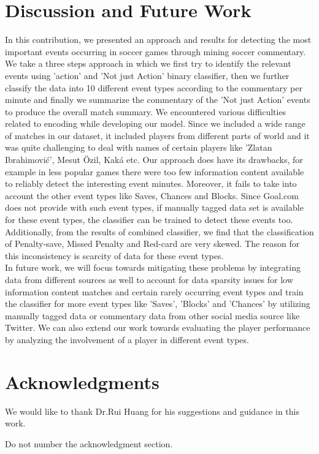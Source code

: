 \documentclass[11pt,letterpaper]{article}
\begin{document}
\section{Discussion and Future Work}
In this contribution, we presented an approach and results for detecting the most
important events occurring in soccer games through mining soccer commentary. We take a three steps approach in which we first try to identify the relevant events using 'action' and 'Not just Action' binary classifier, then we further classify the data into 10 different event types according to the commentary per minute and finally we summarize the commentary of the 'Not just Action' events to produce the overall match summary. We encountered various difficulties related to encoding while developing our model. Since we included a wide range of matches in our dataset, it included players from different parts of world and it was quite challenging to deal with names of certain players like 'Zlatan Ibrahimović', Mesut Özil, Kaká etc. Our approach does have its drawbacks, for example in less popular games there were too few information content available to reliably detect the interesting event minutes. Moreover, it fails to take into account the other event types like Saves, Chances and Blocks. Since Goal.com does not provide with such event types, if manually tagged data set is available for these event types, the classifier can be trained to detect these events too. Additionally, from the results of combined classifier, we find that the classification of Penalty-save, Missed Penalty and Red-card are very skewed. The reason for this inconsistency is scarcity of data for these event types. \\
In future work, we will focus towards mitigating these problems by integrating data from different sources as well to account for data sparsity issues for low information content matches and certain rarely occurring event types and train the classifier for more event types like 'Saves', 'Blocks' and 'Chances' by utilizing manually tagged data or commentary data from other social media source like Twitter. We can also extend our work towards evaluating the player performance by analyzing the involvement of a player in different event types.
\\



\section*{Acknowledgments}
We would like to thank Dr.Rui Huang for his suggestions and guidance in this work.

Do not number the acknowledgment section.



\end{document}

